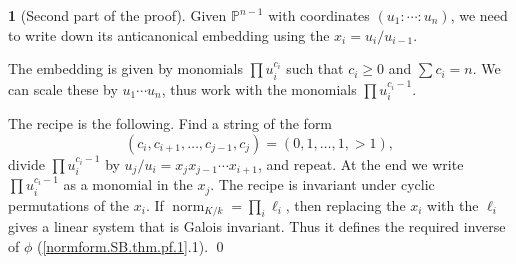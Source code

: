 \documentclass{amsart}
\theoremstyle{definition}
\newtheorem{say}[thm]{}
\theoremstyle{remark}
\newcommand{\p}[0]{{\mathbb P}}
\newcommand{\norm}[0]{\operatorname{norm}}
\begin{document}
\begin{say}[Second part of the proof]\label{normform.SB.thm.pf.2}
  Given $\p^{n-1}$ with coordinates  $(u_1{:}\cdots{:}u_n)$, we need to write down its anticanonical embedding using the $x_i=u_i/u_{i-1}$.

  The embedding is given by monomials  $\prod u_i^{c_i}$ such that $c_i\geq 0$ and $\sum c_i=n$. We can scale these by $u_1\cdots u_n$,
  thus work with the  monomials  $\prod u_i^{c_i-1}$.

  The recipe is the following.  Find a string  of the form
  $$
  (c_i, c_{i+1}, \dots, c_{j-1}, c_j)=(0, 1,\dots, 1,>1),
  $$
  divide  $\prod u_i^{c_i-1}$ by  $u_j/u_i=x_jx_{j-1}\cdots x_{i+1}$,
  and repeat. At the end we write $\prod u_i^{c_i-1}$ as a monomial in the $x_j$. The recipe is invariant under cyclic permutations of the $x_i$.
  If $\norm_{K/k}=\prod_i \ell_i$, then replacing the $x_i$ with the
  $\ell_i$ gives a linear system that is Galois invariant. Thus it defines the required inverse of $\phi$ (\ref{normform.SB.thm.pf.1}.1). \qed
  \end{say}
\end{document}
